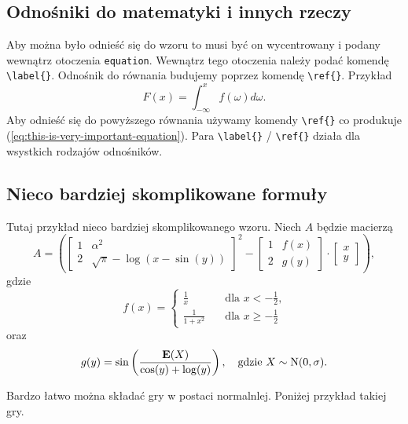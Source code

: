 \documentclass[polish, twoside, 12pt, a4paper]{article}
\theoremstyle{definition}
\theoremstyle{plain}
\theoremstyle{remark}
\begin{document}
\subsection{Odnośniki do matematyki i innych rzeczy}

Aby można było odnieść się do wzoru to musi być on wycentrowany i podany wewnątrz otoczenia \verb+equation+. Wewnątrz tego otoczenia należy podać komendę \verb+\label{}+. Odnośnik do równania budujemy poprzez komendę \verb+\ref{}+. Przykład
\begin{equation}
\label{eq:this-is-very-important-equation}
F(x) = \int_{-\infty}^{x} f(\omega) d\omega.
\end{equation}
Aby odnieść się do powyższego równania używamy komendy \verb+\ref{}+ co produkuje (\ref{eq:this-is-very-important-equation}). Para \verb+\label{}+ / \verb+\ref{}+ działa dla wsystkich rodzajów odnośników.

\subsection{Nieco bardziej skomplikowane formuły}

Tutaj przykład nieco bardziej skomplikowanego wzoru. Niech \( A  \) będzie macierzą
\[
A =
\left(
\begin{bmatrix}
1                   & \alpha^2                             \\
2                   & \sqrt{\pi} - \log(x-\sin(y))
\end{bmatrix}^{2}
-
\begin{bmatrix}
1                   & f(x)                                 \\
2                   & g(y)
\end{bmatrix}
\cdot
\begin{bmatrix}
x                                                          \\
y
\end{bmatrix}
\right),
\]
gdzie
\[
f(x) =
\left\{
  \begin{aligned}
    \frac{1}{x}     & \quad \text{dla \(x<-\frac{1}{2}\),} \\
    \frac{1}{1+x^2} & \quad \text{dla \(x \geq -\frac{1}{2}\)}
  \end{aligned}
\right.
\]
oraz
\[
g(y) = \sin\left(\frac{\mathrm{\mathbf{E}}(X)}{\cos(y) + \log(y)}\right),
\quad\text{gdzie \( X \sim \mathrm{N}(0, \sigma)  \).}
\]

Bardzo łatwo można składać gry w postaci normalnlej. Poniżej przykład takiej gry.
\end{document}
